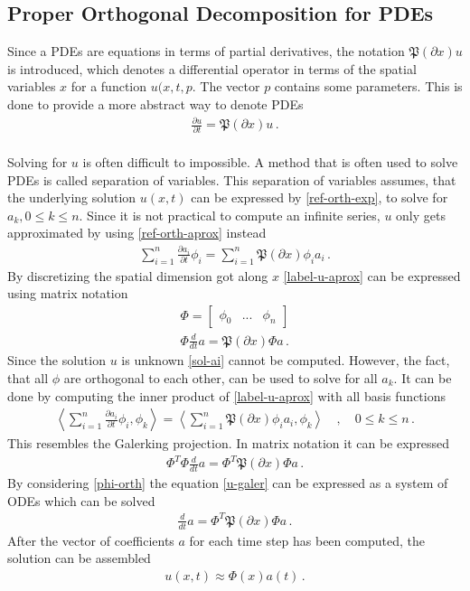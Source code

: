 \subsection{Proper Orthogonal Decomposition for PDEs}
Since a PDEs are equations in terms of partial derivatives, the notation \(\mathfrak{P}(\partial x) u\) is introduced, which denotes a differential operator in terms of the spatial variables \(x\) for a function \(u(x,t,p\).
The vector \(p\) contains some parameters.
This is done to provide a more abstract way to denote PDEs
\begin{gather}
\frac{\partial u}{\partial t} = \mathfrak{P}(\partial x) u \,.
\end{gather}
\cite{Gustafsson2011f} \\
Solving for \(u\) is often difficult to impossible.
A method that is often used to solve PDEs is called separation of variables.
This separation of variables assumes, that the underlying solution \(u(x, t)\) can be expressed by \ref{ref-orth-exp}, to solve for \(a_k, 0 \leq k \leq n\).
Since it is not practical to compute an infinite series, \(u\) only gets approximated by using \ref{ref-orth-aprox} instead
\begin{gather}
\sum_{i = 1} ^{n} \frac{\partial a_i}{\partial t} \phi_i = \sum_{i = 1} ^{n} \mathfrak{P}(\partial x) \phi_i a_i \,. \label{label-u-aprox} 
\end{gather}
By discretizing the spatial dimension got along \(x\) \ref{label-u-aprox} can be expressed using matrix notation
\begin{gather}
\Phi = \begin{bmatrix}
\phi_0 & ... & \phi_n
\end{bmatrix} \label{mat-phi}\\
\Phi \frac{d}{dt}a = \mathfrak{P}(\partial x) \Phi a \,.
\end{gather}
Since the solution \(u\) is unknown \ref{sol-ai} cannot be computed.
However, the fact, that all \(\phi\) are orthogonal to each other, can be used to solve for all \(a_k\).
It can be done by computing the inner product of \ref{label-u-aprox} with all basis functions
\begin{gather}
\left\langle \sum_{i = 1} ^{n} \frac{\partial a_i}{\partial t} \phi_i, \phi_k \right\rangle = \left\langle\sum_{i = 1} ^{n} \mathfrak{P}(\partial x) \phi_i a_i, \phi_k \right\rangle \quad, \quad 0 \leq k \leq n \,. \label{u-galer}
\end{gather}
This resembles the Galerking projection.
In matrix notation it can be expressed
\begin{gather}
\Phi^{T}\Phi \frac{d}{dt}a = \Phi^{T}\mathfrak{P}(\partial x) \Phi a \,.
\end{gather}
By considering \ref{phi-orth}  the equation \ref{u-galer} can be expressed as a system of ODEs which can be solved
\begin{gather}
\frac{d}{dt} a = \Phi^{T}\mathfrak{P}(\partial x) \Phi a \,.
\end{gather}
After the vector of coefficients \(a\) for each time step has been computed, the solution can be assembled \cite{brunton_kutz_2019c}
\begin{gather}
u(x, t) \approx \Phi(x)a(t) \,. \label{u-aprox-pod}
\end{gather} 

